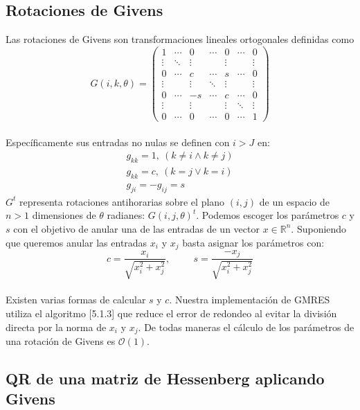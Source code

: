 \documentclass{endm}
\begin{document}
\subsection{Rotaciones de Givens}\label{givens}

Las rotaciones de Givens son transformaciones lineales ortogonales definidas como
\begin{equation*}G(i, k, \theta) = \begin{pmatrix}
1 & \cdots & 0 & \cdots & 0 & \cdots & 0\\
\vdots & \ddots & \vdots & & \vdots & & \vdots\\
0 & \cdots & c & \cdots & s & \cdots & 0\\
\vdots & & \vdots & \ddots & \vdots & & \vdots\\
0 & \cdots & -s & \cdots & c & \cdots & 0\\
\vdots & & \vdots & & \vdots & \ddots & \vdots\\
0 & \cdots & 0 & \cdots & 0 & \cdots & 1
\end{pmatrix}
\end{equation*}\\
Específicamente sus entradas no nulas se definen con $i>J$ en:
\begin{align*}
 g_{kk} = 1, \  (k  \not=i \land k\not=j) \\
 g_{kk} = c, \ (k=j \lor k=i) \\
 g_{ji} = -g_{ij} = s
\end{align*}
$G^t$ representa rotaciones antihorarias sobre el plano $(i,j)$ de un espacio de $n>1$ dimensiones de $\theta$ radianes: $G(i, j, \theta)^{t}$. Podemos escoger los parámetros $c$ y $s$ con el objetivo de anular una de las entradas de un vector $x \in \mathbb{R}^n$. Suponiendo que queremos anular las entradas $x_{i}$ y $x_j$ basta asignar los parámetros con:
\begin{equation*}
c = \frac{x_i}{\sqrt{x_{i}^{2} + x_{j}^{2}}}, \hspace{1cm} s = \frac{-x_j}{\sqrt{x_{i}^{2} + x_{j}^{2}}}
\end{equation*}\\
Existen varias formas de calcular $s$ y $c$. Nuestra implementación de GMRES utiliza el algoritmo [5.1.3]\cite{matrixcomp} que reduce el error de redondeo al evitar la división directa por la norma de $x_{i}$ y $x_j$. De todas maneras el cálculo de los parámetros de una rotación de Givens es $\mathcal{O}(1)$.


\subsection{QR de una matriz de Hessenberg aplicando Givens}\label{QRHgivens}
\end{document}
